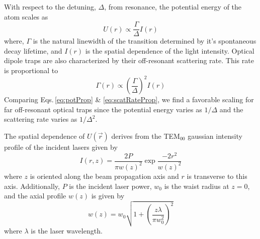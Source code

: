 With respect to the detuning, $\Delta$, from resonance, the potential energy of the atom scales as
\begin{equation} \label{eq:potProp}
	U(r) \varpropto \frac{\Gamma}{\Delta}I(r)
\end{equation}
where, $\Gamma$ is the natural linewidth of the transition determined by it's spontaneous decay lifetime, and $I(r)$ is the spatial dependence of the light intensity.
Optical dipole traps are also characterized by their off-resonant scattering rate.
This rate is proportional to
\begin{equation} \label{eq:scatRateProp}
	\Gamma(r) \varpropto \left(\frac{\Gamma}{\Delta}\right)^2 I(r)
\end{equation}
Comparing Eqs.\,\ref{eq:potProp} \& \ref{eq:scatRateProp}, we find a favorable scaling for far off-resonant optical traps since the potential energy varies as $1/\Delta$ and the scattering rate varies as $1/\Delta^2$. 

The spatial dependence of $U(\vec{r})$ derives from the TEM$_{00}$ gaussian intensity profile of the incident lasers given by
\begin{equation} \label{eq:gaussInt}
	I(r,z) = \frac{2P}{\pi w(z)^2} \exp{\frac{-2 r^2}{w(z)^2}}
\end{equation}
where $z$ is oriented along the beam propagation axis and $r$ is transverse to this axis.
Additionally, $P$ is the incident laser power, $w_0$ is the waist radius at $z=0$, and the axial profile $w(z)$ is given by
\begin{equation} \label{eq:gaussSpot}
	w(z) = w_0 \sqrt{1 + \left( \frac{z \lambda}{\pi w_0^2} \right)^2}
\end{equation}
where $\lambda$ is the laser wavelength.


